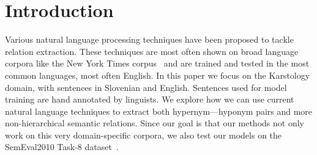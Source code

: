 \documentclass[fleqn,moreauthors,10pt]{ds_report}
\affiliation{\textit{Advisors: Slavko Žitnik}}
\begin{document}
\flushbottom 

\maketitle 

\thispagestyle{empty} 



\section{Introduction}
Various natural language processing techniques have been proposed to tackle relation extraction. These techniques are most often shown on broad language corpora like the New York Times corpus~\cite{sandhaus2008new} and are trained and tested in the most common languages, most often English. In this paper we focus on the Karstology domain, with sentences in Slovenian and English. Sentences used for model training are hand annotated by linguists. We explore how we can use current natural language techniques to extract both hypernym---hyponym pairs and more non-hierarchical semantic relations.  Since our goal is that our methods not only work on this very domain-specific corpora, we also test our models on the SemEval2010 Task-8 dataset~\cite{hendrickx-etal-2010-semeval}. 
\end{document}
